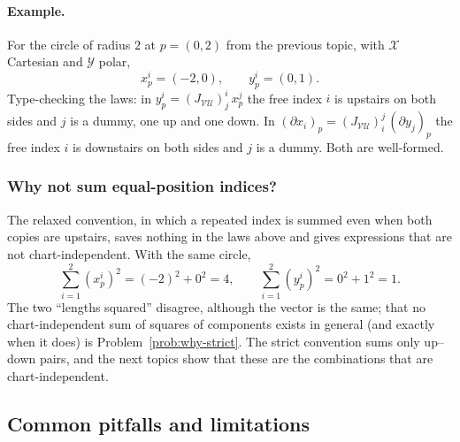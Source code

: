 \documentclass[11pt]{article}
\begin{document}
\paragraph{Example.} For the circle of radius $2$ at $p=(0,2)$ from the previous topic, with $\mathcal X$ Cartesian and $\mathcal Y$ polar,
\[
x^i_p=(-2,0),\qquad y^i_p=(0,1).
\]
Type-checking the laws: in $y^i_p=(J_{\mathcal{VU}})^i_j\,x^j_p$ the free index $i$ is upstairs on both sides and $j$ is a dummy, one up and one down. In $(\partial x_i)_p=(J_{\mathcal{VU}})^j_i\,(\partial y_j)_p$ the free index $i$ is downstairs on both sides and $j$ is a dummy. Both are well-formed.

\subsubsection*{Why not sum equal-position indices?}
The relaxed convention, in which a repeated index is summed even when both copies are upstairs, saves nothing in the laws above and gives expressions that are not chart-independent. With the same circle,
\[
\sum_{i=1}^2(x^i_p)^2=(-2)^2+0^2=4,\qquad\sum_{i=1}^2(y^i_p)^2=0^2+1^2=1.
\]
The two ``lengths squared'' disagree, although the vector is the same; that no chart-independent sum of squares of components exists in general (and exactly when it does) is Problem~\ref{prob:why-strict}. The strict convention sums only up--down pairs, and the next topics show that these are the combinations that are chart-independent.

\subsection*{Common pitfalls and limitations}
\end{document}
